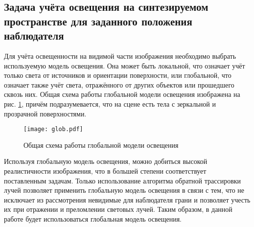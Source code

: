 \subsection{Задача учёта освещения на синтезируемом пространстве для заданного положения наблюдателя}
Для учёта освещенности на видимой части изображения необходимо выбрать используемую модель освещения. Она может быть локальной, что означает учёт только света от источников и ориентации поверхности, или глобальной, что означает также учёт света, отражённого от других объектов или прошедшего сквозь них. Общая схема работы глобальной модели освещения изображена на рис. \ref{img:glob}, причём подразумевается, что на сцене есть тела с зеркальной и прозрачной поверхностями.

\begin{figure}[h!]
    \centering
    \texttt{[image: glob.pdf]}
    \caption{Общая схема работы глобальной модели освещения}
    \label{img:glob}
\end{figure}

Используя глобальную модель освещения, можно добиться высокой реалистичности изображения, что в большей степени соответствует поставленным задачам. Только использование алгоритма обратной трассировки лучей позволяет применить глобальную модель освещения в связи с тем, что не исключает из рассмотрения невидимые для наблюдателя грани и позволяет учесть их при отражении и преломлении световых лучей. Таким образом, в данной работе будет использоваться глобальная модель освещения.

